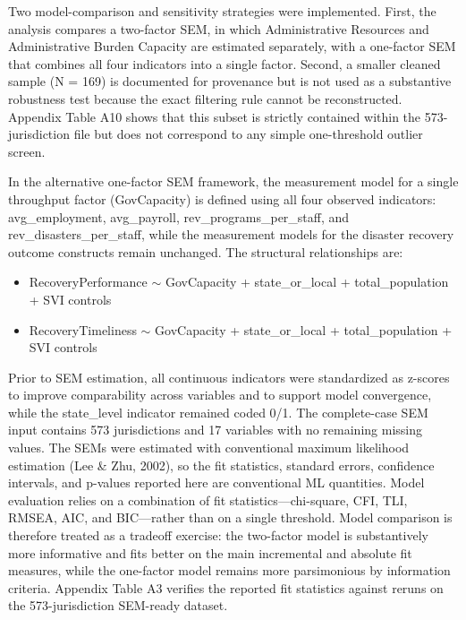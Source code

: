 \documentclass[
  number]{elsarticle}
\providecommand{\tightlist}{%
  \setlength{\itemsep}{0pt}\setlength{\parskip}{0pt}}
\begin{document}
Two model-comparison and sensitivity strategies were implemented. First,
the analysis compares a two-factor SEM, in which Administrative
Resources and Administrative Burden Capacity are estimated separately,
with a one-factor SEM that combines all four indicators into a single
factor. Second, a smaller cleaned sample (N = 169) is documented for
provenance but is not used as a substantive robustness test because the
exact filtering rule cannot be reconstructed. Appendix Table A10 shows
that this subset is strictly contained within the 573-jurisdiction file
but does not correspond to any simple one-threshold outlier screen.

In the alternative one-factor SEM framework, the measurement model for a
single throughput factor (GovCapacity) is defined using all four
observed indicators: avg\_employment, avg\_payroll,
rev\_programs\_per\_staff, and rev\_disasters\_per\_staff, while the
measurement models for the disaster recovery outcome constructs remain
unchanged. The structural relationships are:

\begin{itemize}
\tightlist
\item
  RecoveryPerformance \(\sim\) GovCapacity + state\_or\_local +
  total\_population + SVI controls
\item
  RecoveryTimeliness \(\sim\) GovCapacity + state\_or\_local +
  total\_population + SVI controls
\end{itemize}

Prior to SEM estimation, all continuous indicators were standardized as
z-scores to improve comparability across variables and to support model
convergence, while the state\_level indicator remained coded 0/1. The
complete-case SEM input contains 573 jurisdictions and 17 variables with
no remaining missing values. The SEMs were estimated with conventional
maximum likelihood estimation (Lee \& Zhu, 2002), so the fit statistics,
standard errors, confidence intervals, and p-values reported here are
conventional ML quantities. Model evaluation relies on a combination of
fit statistics---chi-square, CFI, TLI, RMSEA, AIC, and BIC---rather than
on a single threshold. Model comparison is therefore treated as a
tradeoff exercise: the two-factor model is substantively more
informative and fits better on the main incremental and absolute fit
measures, while the one-factor model remains more parsimonious by
information criteria. Appendix Table A3 verifies the reported fit
statistics against reruns on the 573-jurisdiction SEM-ready dataset.
\end{document}
